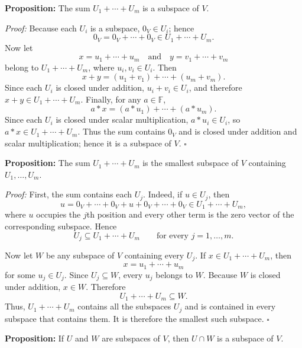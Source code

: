 \documentclass[a4paper,11pt,abstract=true]{scrartcl}
\theoremstyle{dotlessP}
\theoremstyle{dotlessS}
\theoremstyle{remark}
\theoremstyle{definition}
\begin{document}
\begin{problem_box}
\textbf{Proposition:} The sum $U_1+\cdots+U_m$ is a subspace of $V$.

\end{problem_box}

\begin{claim_box}
\textit{Proof:} Because each $U_i$ is a subspace, $0_V\in U_i$; hence
\[
0_V=0_V+\cdots+0_V\in U_1+\cdots+U_m.
\]
Now let
\[
x=u_1+\cdots+u_m
\quad\text{and}\quad
y=v_1+\cdots+v_m
\]
belong to $U_1+\cdots+U_m$, where $u_i,v_i\in U_i$. Then
\[
x+y=(u_1+v_1)+\cdots+(u_m+v_m).
\]
Since each $U_i$ is closed under addition, $u_i+v_i\in U_i$, and therefore
$x+y\in U_1+\cdots+U_m$. Finally, for any $a\in \mathbb{F}$,
\[
a*x=(a*u_1)+\cdots+(a*u_m).
\]
Since each $U_i$ is closed under scalar multiplication, $a*u_i\in U_i$, so
$a*x\in U_1+\cdots+U_m$. Thus the sum contains $0_V$ and is closed under
addition and scalar multiplication; hence it is a subspace of $V$.
\hfill$\square$
\end{claim_box}

\begin{problem_box}
\textbf{Proposition:} The sum $U_1+\cdots+U_m$ is the smallest subspace of
$V$ containing $U_1,\ldots,U_m$.

\end{problem_box}

\begin{claim_box}
\textit{Proof:} First, the sum contains each $U_j$. Indeed, if $u\in U_j$,
then
\[
u=0_V+\cdots+0_V+u+0_V+\cdots+0_V\in U_1+\cdots+U_m,
\]
where $u$ occupies the $j$th position and every other term is the zero vector
of the corresponding subspace. Hence
\[
U_j\subseteq U_1+\cdots+U_m
\qquad\text{for every }j=1,\ldots,m.
\]

Now let $W$ be any subspace of $V$ containing every $U_j$. If
$x\in U_1+\cdots+U_m$, then
\[
x=u_1+\cdots+u_m
\]
for some $u_j\in U_j$. Since $U_j\subseteq W$, every $u_j$ belongs to $W$.
Because $W$ is closed under addition, $x\in W$. Therefore
\[
U_1+\cdots+U_m\subseteq W.
\]
Thus, $U_1+\cdots+U_m$ contains all the subspaces $U_j$ and is contained in
every subspace that contains them. It is therefore the smallest such subspace.
\hfill$\square$
\end{claim_box}

\begin{problem_box}
\textbf{Proposition:} If $U$ and $W$ are
subspaces of $V$, then $U\cap W$ is a subspace of $V$.
\end{problem_box}
\end{document}
